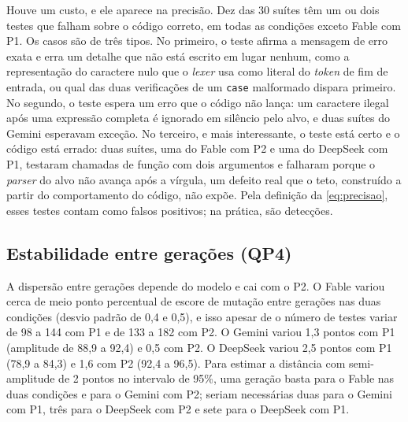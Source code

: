 Houve um custo, e ele aparece na precisão. Dez das 30 suítes têm um ou dois testes que falham sobre o código correto, em todas as condições exceto Fable com P1. Os casos são de três tipos. No primeiro, o teste afirma a mensagem de erro exata e erra um detalhe que não está escrito em lugar nenhum, como a representação do caractere nulo que o \textit{lexer} usa como literal do \textit{token} de fim de entrada, ou qual das duas verificações de um \texttt{case} malformado dispara primeiro. No segundo, o teste espera um erro que o código não lança: um caractere ilegal após uma expressão completa é ignorado em silêncio pelo alvo, e duas suítes do Gemini esperavam exceção. No terceiro, e mais interessante, o teste está certo e o código está errado: duas suítes, uma do Fable com P2 e uma do DeepSeek com P1, testaram chamadas de função com dois argumentos e falharam porque o \textit{parser} do alvo não avança após a vírgula, um defeito real que o teto, construído a partir do comportamento do código, não expõe. Pela definição da \autoref{eq:precisao}, esses testes contam como falsos positivos; na prática, são detecções.

\subsection{Estabilidade entre gerações (QP4)}


A dispersão entre gerações depende do modelo e cai com o P2. O Fable variou cerca de meio ponto percentual de escore de mutação entre gerações nas duas condições (desvio padrão de 0,4 e 0,5), e isso apesar de o número de testes variar de 98 a 144 com P1 e de 133 a 182 com P2. O Gemini variou 1,3 pontos com P1 (amplitude de 88,9 a 92,4) e 0,5 com P2. O DeepSeek variou 2,5 pontos com P1 (78,9 a 84,3) e 1,6 com P2 (92,4 a 96,5). Para estimar a distância com semi-amplitude de 2 pontos no intervalo de 95\%, uma geração basta para o Fable nas duas condições e para o Gemini com P2; seriam necessárias duas para o Gemini com P1, três para o DeepSeek com P2 e sete para o DeepSeek com P1.

